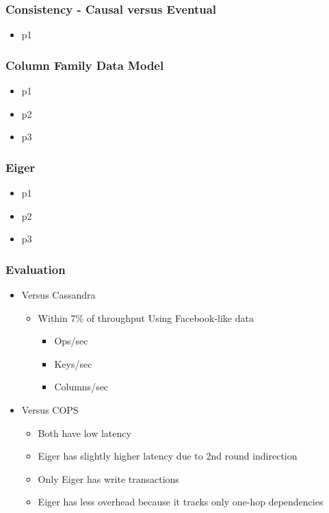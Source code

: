 \documentclass{beamer}
\begin{document}
\begin{frame}
\frametitle{Consistency - Causal versus Eventual}
\begin{itemize}
\pause \item p1	
\end{itemize}  
\end{frame}

\begin{frame}
\frametitle{Column Family Data Model}
\begin{itemize}
\pause \item p1 %
\pause \item p2
\pause \item p3
\end{itemize}  
\end{frame}



\begin{frame}
\frametitle{Eiger}
\begin{itemize}
\pause \item p1 %
\pause \item p2
\pause \item p3
\end{itemize}  
\end{frame}

\begin{frame}
\frametitle{Evaluation}
\begin{itemize}
\pause \item Versus Cassandra
		\begin{itemize}
			\item Within 7\% of throughput Using Facebook-like data
			\begin{itemize}
				\item Ops/sec
				\item Keys/sec
				\item Columns/sec
			\end{itemize}
		\end{itemize}
\pause \item Versus COPS
		\begin{itemize}	
			\item Both have low latency
			\item Eiger has slightly higher latency due to 2nd round indirection
			\item Only Eiger has write transactions
			\item Eiger has less overhead because it tracks only one-hop dependencies
		\end{itemize}
\end{itemize}  
\end{frame}
\end{document}
